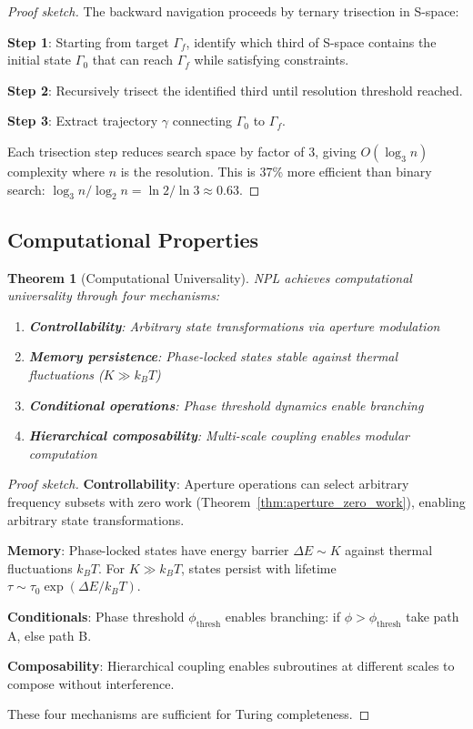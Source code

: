 \documentclass[aps,prd,twocolumn,superscriptaddress,floatfix,nofootinbib]{revtex4-2}
\newtheorem{theorem}{Theorem}[section]
\theoremstyle{remark}
\begin{document}
\begin{proof}[Proof sketch]
The backward navigation proceeds by ternary trisection in S-space:

\textbf{Step 1}: Starting from target $\Gamma_f$, identify which third of S-space contains the initial state $\Gamma_0$ that can reach $\Gamma_f$ while satisfying constraints.

\textbf{Step 2}: Recursively trisect the identified third until resolution threshold reached.

\textbf{Step 3}: Extract trajectory $\gamma$ connecting $\Gamma_0$ to $\Gamma_f$.

Each trisection step reduces search space by factor of 3, giving $O(\log_3 n)$ complexity where $n$ is the resolution. This is 37\% more efficient than binary search: $\log_3 n / \log_2 n = \ln 2 / \ln 3 \approx 0.63$.
\end{proof}

\subsection{Computational Properties}

\begin{theorem}[Computational Universality]
\label{thm:npl_universality}
NPL achieves computational universality through four mechanisms:
\begin{enumerate}
\item \textbf{Controllability}: Arbitrary state transformations via aperture modulation
\item \textbf{Memory persistence}: Phase-locked states stable against thermal fluctuations ($K \gg k_B T$)
\item \textbf{Conditional operations}: Phase threshold dynamics enable branching
\item \textbf{Hierarchical composability}: Multi-scale coupling enables modular computation
\end{enumerate}
\end{theorem}

\begin{proof}[Proof sketch]
\textbf{Controllability}: Aperture operations can select arbitrary frequency subsets with zero work (Theorem~\ref{thm:aperture_zero_work}), enabling arbitrary state transformations.

\textbf{Memory}: Phase-locked states have energy barrier $\Delta E \sim K$ against thermal fluctuations $k_B T$. For $K \gg k_B T$, states persist with lifetime $\tau \sim \tau_0 \exp(\Delta E / k_B T)$.

\textbf{Conditionals}: Phase threshold $\phi_{\text{thresh}}$ enables branching: if $\phi > \phi_{\text{thresh}}$ take path A, else path B.

\textbf{Composability}: Hierarchical coupling enables subroutines at different scales to compose without interference.

These four mechanisms are sufficient for Turing completeness.
\end{proof}
\end{document}
